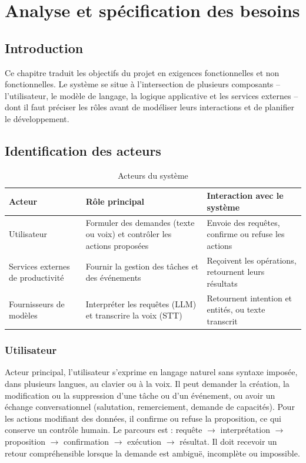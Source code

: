 \documentclass[11pt,a4paper,openany,oneside]{report}
\newcommand{\chapintro}{\section*{Introduction}\phantomsection\addcontentsline{toc}{section}{Introduction}}
\begin{document}
\chapter{Analyse et spécification des besoins}\label{chap:besoins}
\chapintro
Ce chapitre traduit les objectifs du projet en exigences fonctionnelles et non fonctionnelles. Le système se situe à l'intersection de plusieurs composants -- l'utilisateur, le modèle de langage, la logique applicative et les services externes -- dont il faut préciser les rôles avant de modéliser leurs interactions et de planifier le développement.

\section{Identification des acteurs}
\begin{table}[htbp]
\centering\small
\caption{Acteurs du système}\label{tab:acteurs}
\begin{tabularx}{\textwidth}{@{}p{3.4cm}XX@{}}
\toprule
\textbf{Acteur} & \textbf{Rôle principal} & \textbf{Interaction avec le système} \\
\midrule
Utilisateur & Formuler des demandes (texte ou voix) et contrôler les actions proposées & Envoie des requêtes, confirme ou refuse les actions \\
Services externes de productivité & Fournir la gestion des tâches et des événements & Reçoivent les opérations, retournent leurs résultats \\
Fournisseurs de modèles & Interpréter les requêtes (LLM) et transcrire la voix (STT) & Retournent intention et entités, ou texte transcrit \\
\bottomrule
\end{tabularx}
\end{table}

\subsection{Utilisateur}
Acteur principal, l'utilisateur s'exprime en langage naturel sans syntaxe imposée, dans plusieurs langues, au clavier ou à la voix. Il peut demander la création, la modification ou la suppression d'une tâche ou d'un événement, ou avoir un échange conversationnel (salutation, remerciement, demande de capacités). Pour les actions modifiant des données, il confirme ou refuse la proposition, ce qui conserve un contrôle humain. Le parcours est : requête $\rightarrow$ interprétation $\rightarrow$ proposition $\rightarrow$ confirmation $\rightarrow$ exécution $\rightarrow$ résultat. Il doit recevoir un retour compréhensible lorsque la demande est ambiguë, incomplète ou impossible.
\end{document}
